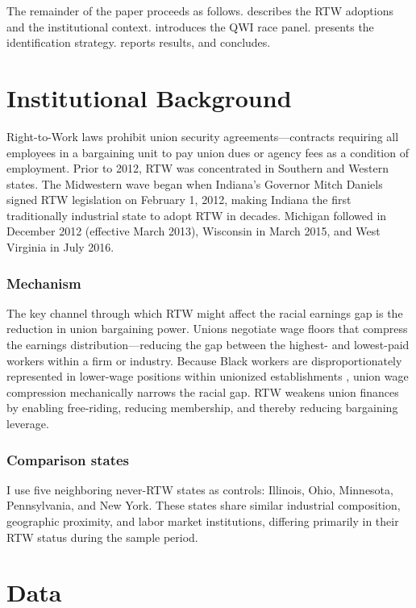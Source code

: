 \documentclass[12pt]{article}
\begin{document}
The remainder of the paper proceeds as follows.  describes the RTW adoptions and the institutional context.  introduces the QWI race panel.  presents the identification strategy.  reports results, and  concludes.


\section{Institutional Background}
\label{sec:background}

Right-to-Work laws prohibit union security agreements---contracts requiring all employees in a bargaining unit to pay union dues or agency fees as a condition of employment. Prior to 2012, RTW was concentrated in Southern and Western states. The Midwestern wave began when Indiana's Governor Mitch Daniels signed RTW legislation on February 1, 2012, making Indiana the first traditionally industrial state to adopt RTW in decades. Michigan followed in December 2012 (effective March 2013), Wisconsin in March 2015, and West Virginia in July 2016.

\subsubsection*{Mechanism} The key channel through which RTW might affect the racial earnings gap is the reduction in union bargaining power. Unions negotiate wage floors that compress the earnings distribution---reducing the gap between the highest- and lowest-paid workers within a firm or industry. Because Black workers are disproportionately represented in lower-wage positions within unionized establishments \citep{freeman1980unionism}, union wage compression mechanically narrows the racial gap. RTW weakens union finances by enabling free-riding, reducing membership, and thereby reducing bargaining leverage.

\subsubsection*{Comparison states} I use five neighboring never-RTW states as controls: Illinois, Ohio, Minnesota, Pennsylvania, and New York. These states share similar industrial composition, geographic proximity, and labor market institutions, differing primarily in their RTW status during the sample period.


\section{Data}
\label{sec:data}
\end{document}
